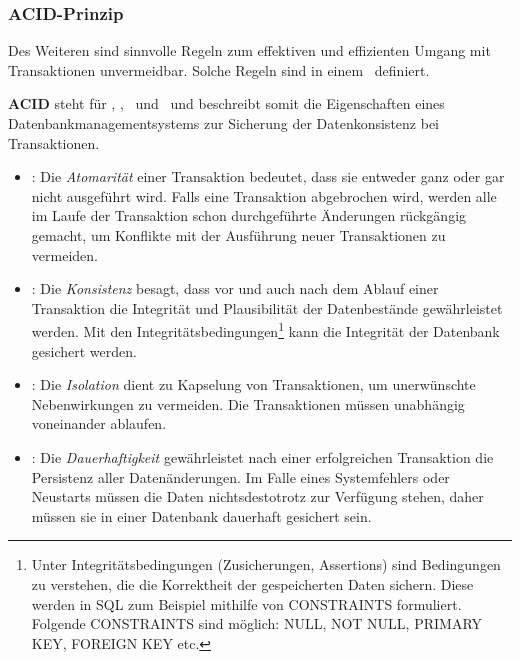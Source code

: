 \subsubsection{ACID-Prinzip}\label{acid}

Des Weiteren sind sinnvolle Regeln zum effektiven und effizienten Umgang mit Transaktionen unvermeidbar. Solche Regeln sind in einem \acid\ definiert.

\textbf{ACID} steht für \Acid, \aCid, \acId\ und \aciD\ und beschreibt somit die Eigenschaften eines Datenbankmanagementsystems zur Sicherung der Datenkonsistenz bei Transaktionen.
\begin{itemize}

\item \Acid: Die \textit{Atomarität} einer Transaktion bedeutet, dass sie entweder ganz oder gar nicht ausgeführt wird. Falls eine Transaktion abgebrochen wird, werden alle im Laufe der Transaktion schon durchgeführte Änderungen rückgängig gemacht, um Konflikte mit der Ausführung neuer Transaktionen zu vermeiden.%
\item \aCid: Die \textit{Konsistenz} besagt, dass vor und auch nach dem Ablauf einer Transaktion die Integrität und Plausibilität der Datenbestände gewährleistet werden. Mit den Integritätsbedingungen\footnote{Unter Integritätsbedingungen (Zusicherungen, Assertions) sind Bedingungen zu verstehen, die die Korrektheit der gespeicherten Daten sichern. Diese werden in SQL zum Beispiel mithilfe von CONSTRAINTS formuliert. Folgende CONSTRAINTS sind möglich: NULL, NOT NULL, PRIMARY KEY, FOREIGN KEY etc.} kann die Integrität der Datenbank gesichert werden.
\item \acId: Die \textit{Isolation} dient zu Kapselung von Transaktionen, um unerwünschte Nebenwirkungen zu vermeiden. Die Transaktionen müssen unabhängig voneinander ablaufen.
\item \aciD: Die \textit{Dauerhaftigkeit} gewährleistet nach einer erfolgreichen Transaktion die Persistenz aller Datenänderungen. Im Falle eines Systemfehlers oder Neustarts müssen die Daten nichtsdestotrotz zur Verfügung stehen, daher müssen sie in einer Datenbank dauerhaft gesichert sein.
\end{itemize}

